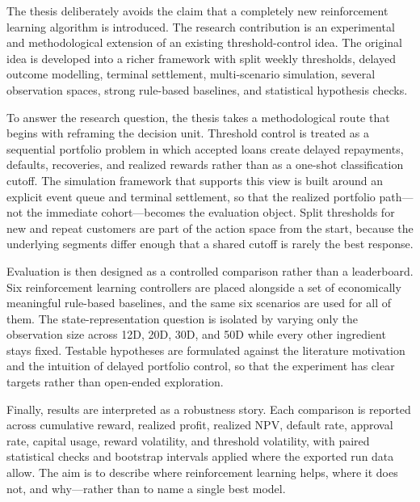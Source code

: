 \documentclass[12pt,a4paper]{article}
\begin{document}
The thesis deliberately avoids the claim that a completely new reinforcement learning algorithm is introduced. The research contribution is an experimental and methodological extension of an existing threshold-control idea. The original idea is developed into a richer framework with split weekly thresholds, delayed outcome modelling, terminal settlement, multi-scenario simulation, several observation spaces, strong rule-based baselines, and statistical hypothesis checks.

To answer the research question, the thesis takes a methodological route that begins with reframing the decision unit. Threshold control is treated as a sequential portfolio problem in which accepted loans create delayed repayments, defaults, recoveries, and realized rewards rather than as a one-shot classification cutoff. The simulation framework that supports this view is built around an explicit event queue and terminal settlement, so that the realized portfolio path---not the immediate cohort---becomes the evaluation object. Split thresholds for new and repeat customers are part of the action space from the start, because the underlying segments differ enough that a shared cutoff is rarely the best response.

Evaluation is then designed as a controlled comparison rather than a leaderboard. Six reinforcement learning controllers are placed alongside a set of economically meaningful rule-based baselines, and the same six scenarios are used for all of them. The state-representation question is isolated by varying only the observation size across 12D, 20D, 30D, and 50D while every other ingredient stays fixed. Testable hypotheses are formulated against the literature motivation and the intuition of delayed portfolio control, so that the experiment has clear targets rather than open-ended exploration.

Finally, results are interpreted as a robustness story. Each comparison is reported across cumulative reward, realized profit, realized NPV, default rate, approval rate, capital usage, reward volatility, and threshold volatility, with paired statistical checks and bootstrap intervals applied where the exported run data allow. The aim is to describe where reinforcement learning helps, where it does not, and why---rather than to name a single best model.
\end{document}
